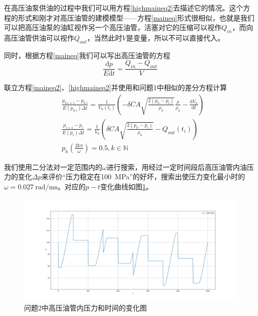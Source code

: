 \documentclass[12pt,AutoFakeBold]{article}%
\newcommand{\dif}{\mathrm{d}}
\begin{document}
    在高压油泵供油的过程中我们可以用方程\ref{highmaineq2}去描述它的情况。这个方程的形式和刚才对高压油管的建模模型——方程\ref{maineq}形式很相似，也就是我们可以把高压油泵的油缸视作另一个高压油管，活塞对它的压缩可以视作$Q_{in}$，而向高压油管供油可以视作$Q_{out}$，当然此时$V$是变量，所以不可以直接代入。\par
    同时，根据方程\ref{maineq}我们可以写出高压油管的方程
    \begin{equation}
        \frac{\dif p}{E\dif t}=\frac{Q_{in}-Q_{out}}{V}
        \label{maineq2}
    \end{equation}\par
    联立方程\ref{maineq2}、\ref{highmaineq2}并使用和问题1中相似的差分方程计算
    \begin{equation}
        \begin{aligned}
            &\frac{p_{h\ i+1}-p_{h\ i}}{E(p_{h\ i})\Delta t}=\frac{1}{V_h(t_i)}\left(-\delta CA\sqrt{\frac{2\left(p_h-p_i\right)}{\rho_h}}\frac{\rho}{\rho_h}-\frac{\dif V_h}{\dif t}\right)\\
            &\frac{p_{i+1}-p_i}{E(p_i)\Delta t}=\frac{1}{V_0}\left(\delta CA\sqrt{\frac{2\left(p_h-p_i\right)}{\rho_h}}-Q_{out}(t_i)\right)\\
            &p_h(\frac{2k\pi}{\omega})=0.5,k\in\mathbb{N}
        \end{aligned}
    \end{equation}\par
    我们使用二分法对一定范围内的$\omega$进行搜索，用经过一定时间段后高压油管内油压力的变化$\Delta p$来评价“压力稳定在\SI{100}{\MPa}”的好坏，搜索出使压力变化最小时的$\omega=\SI{0.027}{\radian\per\ms}$。对应的$p-t$变化曲线如图\ref{ptfigure2}。\par
    \begin{figure}[h]
        \centering
        \includegraphics[scale = 0.32]{figure/2-1.png}
        \caption{问题2中高压油管内压力和时间的变化图}
        \label{ptfigure2}
    \end{figure}
\end{document}
